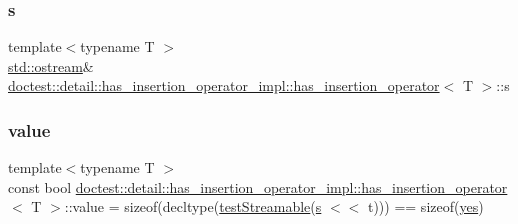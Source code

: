 \subsubsection{\texorpdfstring{s}{s}}
{\footnotesize\ttfamily template$<$typename T $>$ \\
\hyperlink{doctest_8h_a116af65cb5e924b33ad9d9ecd7a783f3}{std\+::ostream}\& \hyperlink{structdoctest_1_1detail_1_1has__insertion__operator__impl_1_1has__insertion__operator}{doctest\+::detail\+::has\+\_\+insertion\+\_\+operator\+\_\+impl\+::has\+\_\+insertion\+\_\+operator}$<$ T $>$\+::s\hspace{0.3cm}{\ttfamily [static]}}

\mbox{\label{structdoctest_1_1detail_1_1has__insertion__operator__impl_1_1has__insertion__operator_a8e8e9abdead07386f3d1f16bbca64986}} 
\subsubsection{\texorpdfstring{value}{value}}
{\footnotesize\ttfamily template$<$typename T $>$ \\
const bool \hyperlink{structdoctest_1_1detail_1_1has__insertion__operator__impl_1_1has__insertion__operator}{doctest\+::detail\+::has\+\_\+insertion\+\_\+operator\+\_\+impl\+::has\+\_\+insertion\+\_\+operator}$<$ T $>$\+::value = sizeof(decltype(\hyperlink{namespacedoctest_1_1detail_1_1has__insertion__operator__impl_a0d220c1c0845fcc4952ed6d45ac254aa}{test\+Streamable}(\hyperlink{structdoctest_1_1detail_1_1has__insertion__operator__impl_1_1has__insertion__operator_abdd586daed17058bb6d08adc796802f0}{s} $<$$<$ t))) == sizeof(\hyperlink{namespacedoctest_1_1detail_1_1has__insertion__operator__impl_a0351593f27f12bf077fd702f6fc26fb5}{yes})\hspace{0.3cm}{\ttfamily [static]}}

